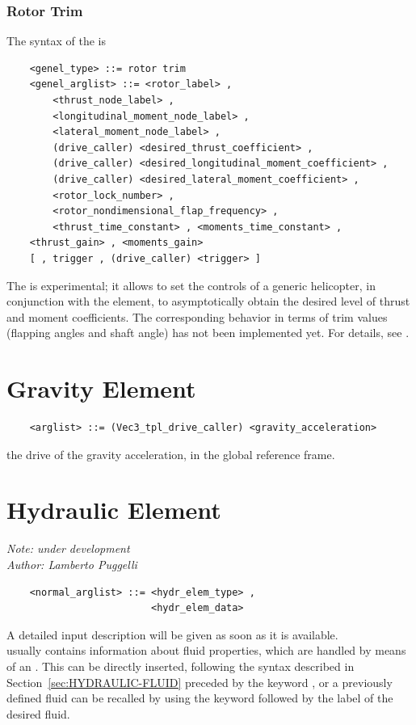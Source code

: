 \subsubsection{Rotor Trim}
The syntax of the  is
\begin{verbatim}
    <genel_type> ::= rotor trim
    <genel_arglist> ::= <rotor_label> ,
        <thrust_node_label> ,
        <longitudinal_moment_node_label> ,
        <lateral_moment_node_label> ,
        (drive_caller) <desired_thrust_coefficient> ,
        (drive_caller) <desired_longitudinal_moment_coefficient> ,
        (drive_caller) <desired_lateral_moment_coefficient> ,
        <rotor_lock_number> ,
        <rotor_nondimensional_flap_frequency> ,
        <thrust_time_constant> , <moments_time_constant> ,
	<thrust_gain> , <moments_gain>
	[ , trigger , (drive_caller) <trigger> ]
\end{verbatim}
The  is experimental; it allows to set the controls 
of a generic helicopter, in conjunction with the 
element, to asymptotically obtain the desired level of thrust and
moment coefficients.
The corresponding behavior in terms of trim values (flapping angles
and shaft angle) has not been implemented yet.
For details, see \cite{PETERS-TRIM90}.







\section{Gravity Element}
\begin{verbatim}
    <arglist> ::= (Vec3_tpl_drive_caller) <gravity_acceleration>
\end{verbatim}
the drive of the gravity acceleration, in the global reference frame.




\section{Hydraulic Element}\label{sec:EL:HYDR}
{\em 
    Note: under development \\
    Author: Lamberto Puggelli
}
\begin{verbatim}
    <normal_arglist> ::= <hydr_elem_type> , 
                         <hydr_elem_data>
\end{verbatim}
A detailed input description will be given as soon as it is available. \\
 usually contains information about fluid
properties, which are handled by means of an .
This can be directly inserted, following the syntax described in
Section~\ref{sec:HYDRAULIC-FLUID} preceded by the keyword , or a
previously defined fluid can be recalled by using the keyword 
 followed by the label of the desired fluid.

